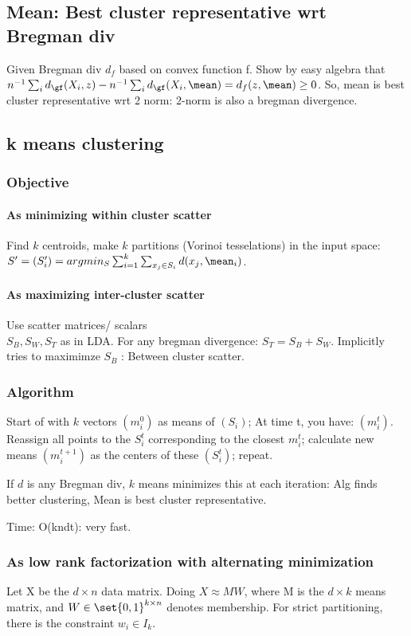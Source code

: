 \documentclass[oneside, article]{memoir}
\begin{document}
\subsection{Mean: Best cluster representative wrt Bregman div}
Given Bregman div $d_f$ based on convex function f. Show by easy algebra that $n^{-1}\sum_i d_\gf(X_i, z) - n^{-1}\sum_i d_\gf(X_i, \mean) = d_f(z, \mean) \geq 0$. So, mean is best cluster representative wrt 2 norm: 2-norm is also a bregman divergence.

\subsection{k means clustering}
\subsubsection{Objective}
\paragraph*{As minimizing within cluster scatter}
Find $k$ centroids, make $k$ partitions (Vorinoi tesselations) in the input space: \\
$S' = (S_{i}') = argmin_{S} \sum_{i=1}^{k} \sum_{x_{j} \in S_{i}} d(x_{j}, \mean_{i})$.

\paragraph*{As maximizing inter-cluster scatter}
Use scatter matrices/ scalars \\
$S_B, S_W, S_T$ as in LDA. For any bregman divergence: $S_T = S_B + S_W$. Implicitly tries to maximimze $S_B$ : Between cluster scatter.

\subsubsection{Algorithm}
Start of with $k$ vectors $(m_{i}^{0})$ as means of $(S_{i})$; At time t, you have: $(m_{i}^{t})$. Reassign all points to the $S_{i}^{t}$ corresponding to the closest $m_{i}^{t}$; calculate new means $(m_{i}^{t+1})$ as the centers of these $(S_{i}^{t})$; repeat.

If $d$ is any Bregman div, $k$ means minimizes this at each iteration: Alg finds better clustering, Mean is best cluster representative.

Time: O(kndt): very fast.

\subsubsection{As low rank factorization with alternating minimization}
Let X be the $d \times n$ data matrix. Doing $X \approx MW$, where M is the $d \times k$ means matrix, and $W \in \set{0, 1}^{k\times n}$ denotes membership. For strict partitioning, there is the constraint $w_i \in I_k$.
\end{document}
